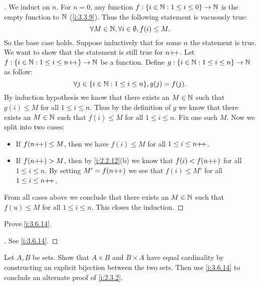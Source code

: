 \begin{proof}[]
  We induct on \(n\).
  For \(n = 0\), any function \(f : \left\lbrace i \in \mathbb{N} : 1 \leq i \leq 0\right\rbrace \to \mathbb{N}\) is the empty function to \(\mathbb{N}\) (\cref{i:3.3.9}).
  Thus the following statement is vacuously true:
  \[
    \forall M \in \mathbb{N}, \forall i \in \emptyset, f(i) \leq M.
  \]
  So the base case holds.
  Suppose inductively that for some \(n\) the statement is true.
  We want to show that the statement is still true for \(n{+}\!{+}\).
  Let \(f : \left\lbrace i \in \mathbb{N} : 1 \leq i \leq n{+}\!{+}\right\rbrace \to \mathbb{N}\) be a function.
  Define \(g : \left\lbrace i \in \mathbb{N} : 1 \leq i \leq n\right\rbrace \to \mathbb{N}\) as follow:
  \[
    \forall j \in \set{i \in \N : 1 \leq i \leq n}, g(j) = f(j).
  \]
  By induction hypothesis we know that there exists an \(M \in \mathbb{N}\) such that \(g(i) \leq M\) for all \(1 \leq i \leq n\).
  Thus by the definition of \(g\) we know that there exists an \(M \in \mathbb{N}\) such that \(f(i) \leq M\) for all \(1 \leq i \leq n\).
  Fix one such \(M\).
  Now we split into two cases:
  \begin{itemize}
    \item If \(f(n{+}\!{+}) \leq M\), then we have \(f(i) \leq M\) for all \(1 \leq i \leq n{+}\!{+}\).
    \item If \(f(n{+}\!{+}) > M\), then by \cref{i:2.2.12}(b) we know that \(f(i) < f(n{+}\!{+})\) for all \(1 \leq i \leq n\).
          By setting \(M' = f(n{+}\!{+})\) we see that \(f(i) \leq M'\) for all \(1 \leq i \leq n{+}\!{+}\).
  \end{itemize}
  From all cases above we conclude that there exists an \(M \in \mathbb{N}\) such that \(f(u) \leq M\) for all \(1 \leq i \leq n\).
  This closes the induction.
\end{proof}

\begin{ex}\label{i:ex:3.6.4}
  Prove \cref{i:3.6.14}.
\end{ex}

\begin{proof}[]
  See \cref{i:3.6.14}.
\end{proof}

\begin{ex}\label{i:ex:3.6.5}
  Let \(A, B\) be sets.
  Show that \(A \times B\) and \(B \times A\) have equal cardinality by constructing an explicit bijection between the two sets.
  Then use \cref{i:3.6.14} to conclude an alternate proof of \cref{i:2.3.2}.
\end{ex}


